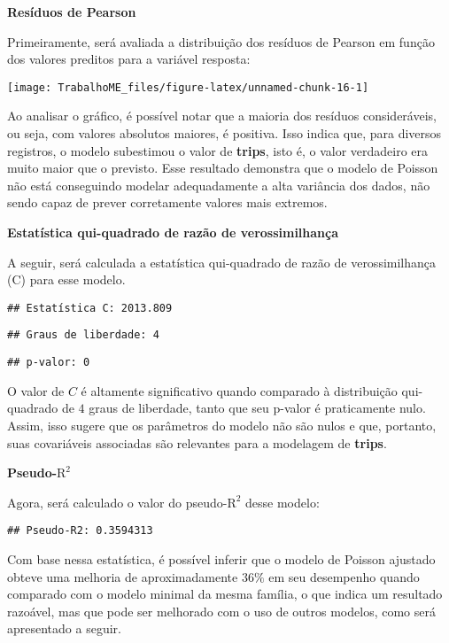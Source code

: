 \documentclass[
]{article}
\begin{document}
\textbf{Resíduos de Pearson}

Primeiramente, será avaliada a distribuição dos resíduos de Pearson em
função dos valores preditos para a variável resposta:

\begin{center}\texttt{[image: TrabalhoME\_files/figure-latex/unnamed-chunk-16-1]} \end{center}

Ao analisar o gráfico, é possível notar que a maioria dos resíduos
consideráveis, ou seja, com valores absolutos maiores, é positiva. Isso
indica que, para diversos registros, o modelo subestimou o valor de
\textbf{trips}, isto é, o valor verdadeiro era muito maior que o
previsto. Esse resultado demonstra que o modelo de Poisson não está
conseguindo modelar adequadamente a alta variância dos dados, não sendo
capaz de prever corretamente valores mais extremos.

\textbf{Estatística qui-quadrado de razão de verossimilhança}

A seguir, será calculada a estatística qui-quadrado de razão de
verossimilhança (C) para esse modelo.

\begin{verbatim}
## Estatística C: 2013.809
\end{verbatim}

\begin{verbatim}
## Graus de liberdade: 4
\end{verbatim}

\begin{verbatim}
## p-valor: 0
\end{verbatim}

O valor de \(C\) é altamente significativo quando comparado à
distribuição qui-quadrado de \(4\) graus de liberdade, tanto que seu
p-valor é praticamente nulo. Assim, isso sugere que os parâmetros do
modelo não são nulos e que, portanto, suas covariáveis associadas são
relevantes para a modelagem de \textbf{trips}.

\textbf{Pseudo-\(\text{R}^2\)}

Agora, será calculado o valor do pseudo-\(\text{R}^2\) desse modelo:

\begin{verbatim}
## Pseudo-R2: 0.3594313
\end{verbatim}

Com base nessa estatística, é possível inferir que o modelo de Poisson
ajustado obteve uma melhoria de aproximadamente \(36\%\) em seu
desempenho quando comparado com o modelo minimal da mesma família, o que
indica um resultado razoável, mas que pode ser melhorado com o uso de
outros modelos, como será apresentado a seguir.
\end{document}
